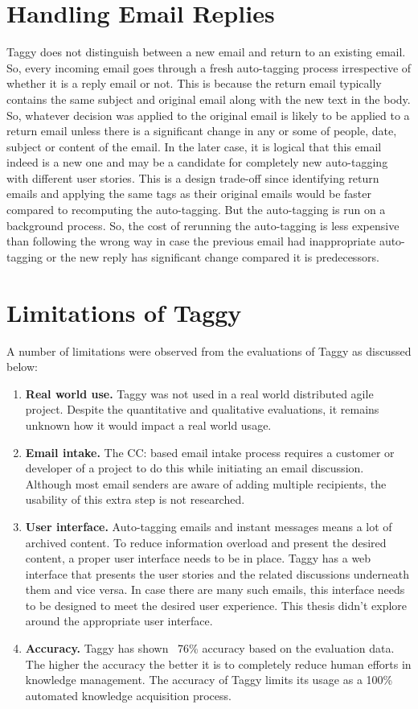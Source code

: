 \section{Handling Email Replies}
Taggy does not distinguish between a new email and return to an existing email. So, every incoming email goes through a fresh auto-tagging process irrespective of whether it is a reply email or not. This is because the return email typically contains the same subject and original email along with the new text in the body. So, whatever decision was applied to the original email is likely to be applied to a return email unless there is a significant change in any or some of people, date, subject or content of the email. In the later case, it is logical that this email indeed is a new one and may be a candidate for completely new auto-tagging with different user stories. This is a design trade-off since identifying return emails and applying the same tags as their original emails would be faster compared to recomputing the auto-tagging. But the auto-tagging is run on a background process. So, the cost of rerunning the auto-tagging is less expensive than following the wrong way in case the previous email had inappropriate auto-tagging or the new reply has significant change compared it is predecessors.


\section{Limitations of Taggy}
A number of limitations were observed from the evaluations of Taggy as discussed below:

\begin{enumerate}
	\item \textbf{Real world use.} Taggy was not used in a real world distributed agile project. Despite the quantitative and qualitative evaluations, it remains unknown how it would impact a real world usage.
	\item \textbf{Email intake.} The CC: based email intake process requires a customer or developer of a project to do this while initiating an email discussion. Although most email senders are aware of adding multiple recipients, the usability of this extra step is not researched.
	\item \textbf{User interface.} Auto-tagging emails and instant messages means a lot of archived content. To reduce information overload and present the desired content, a proper user interface needs to be in place. Taggy has a web interface that presents the user stories and the related discussions underneath them and vice versa. In case there are many such emails, this interface needs to be designed to meet the desired user experience. This thesis didn't explore around the appropriate user interface.
	\item \textbf{Accuracy.} Taggy has shown ~76\% accuracy based on the evaluation data. The higher the accuracy the better it is to completely reduce human efforts in knowledge management. The accuracy of Taggy limits its usage as a 100\% automated knowledge acquisition process.
\end{enumerate}







